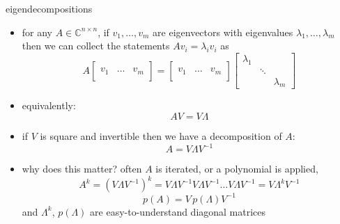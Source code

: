 \documentclass[10pt,hyperref]{beamer}
\newcommand{\CC}{\mathbb{C}}
\newcommand{\trefmatrixtwo}[2]{\left[\begin{array}{c|c|c} & & \\ #1 & \dots & #2 \\ & & \end{array}\right]}
\begin{document}
\begin{frame}{eigendecompositions}

\begin{itemize}
\item for any $A\in\CC^{n\times n}$, if $v_1,\dots,v_m$ are eigenvectors with eigenvalues $\lambda_1,\dots,\lambda_m$ then we can collect the statements $A v_i=\lambda_i v_i$ as
\small
    $$A \trefmatrixtwo{v_1}{v_m} =  \trefmatrixtwo{v_1}{v_m} \begin{bmatrix} \lambda_1 & & \\ & \ddots & \\ & & \lambda_m \end{bmatrix}$$
\normalsize
\item equivalently:
    $$A V = V \Lambda$$
\item if $V$ is square and invertible then we have a decomposition of $A$:
    $$A = V \Lambda V^{-1}$$
\item why does this matter?  often $A$ is iterated, or a polynomial is applied,
    $$A^k = (V \Lambda V^{-1})^k = V \Lambda V^{-1}V \Lambda V^{-1}\dots V \Lambda V^{-1} = V \Lambda^k V^{-1}$$
    $$p(A) = V\, p(\Lambda) V^{-1}$$
and $\Lambda^k$, $p(\Lambda)$ are easy-to-understand diagonal matrices
\end{itemize}
\end{frame}
\end{document}
